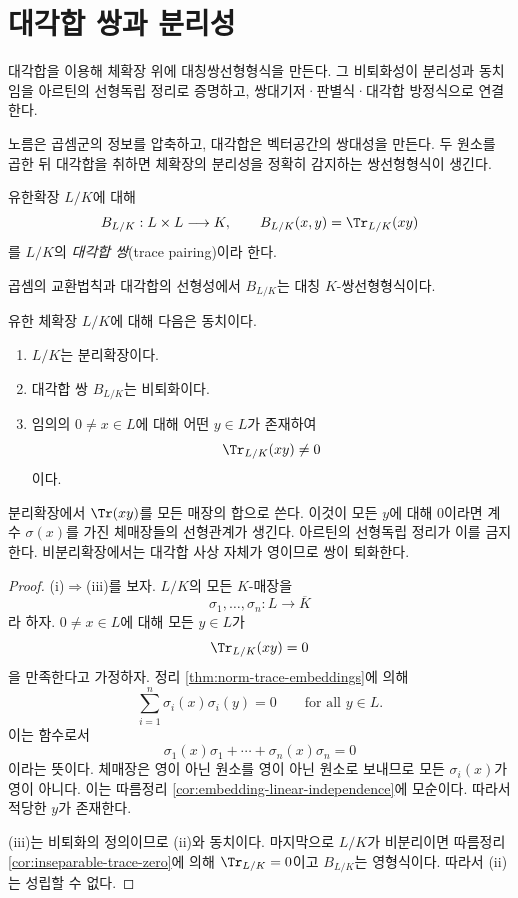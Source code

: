 \clearpage
\section{대각합 쌍과 분리성}
\label{sec:trace-pairing-separability}

\begin{learninggoal}
대각합을 이용해 체확장 위에 대칭쌍선형형식을 만든다. 그 비퇴화성이 분리성과 동치임을 아르틴의 선형독립 정리로 증명하고, 쌍대기저·판별식·대각합 방정식으로 연결한다.
\end{learninggoal}

노름은 곱셈군의 정보를 압축하고, 대각합은 벡터공간의 쌍대성을 만든다. 두 원소를 곱한 뒤 대각합을 취하면 체확장의 분리성을 정확히 감지하는 쌍선형형식이 생긴다.

\begin{definition}[대각합 쌍]
\label{def:trace-pairing}
유한확장 $L/K$에 대해
\[
  B_{L/K}:L\times L\longrightarrow K,
  \qquad
  B_{L/K}(x,y)=\Tr_{L/K}(xy)
\]
를 $L/K$의 \emph{대각합 쌍}(trace pairing)이라 한다.
\end{definition}

곱셈의 교환법칙과 대각합의 선형성에서 $B_{L/K}$는 대칭 $K$-쌍선형형식이다.

\begin{theorem}
\label{thm:trace-pairing-separable-criterion}
유한 체확장 $L/K$에 대해 다음은 동치이다.
\begin{enumerate}[label=(\roman*)]
  \item $L/K$는 분리확장이다.
  \item 대각합 쌍 $B_{L/K}$는 비퇴화이다.
  \item 임의의 $0\ne x\in L$에 대해 어떤 $y\in L$가 존재하여
  \[
    \Tr_{L/K}(xy)\ne0
  \]
  이다.
\end{enumerate}
\end{theorem}

\begin{proofidea}
분리확장에서 $\Tr(xy)$를 모든 매장의 합으로 쓴다. 이것이 모든 $y$에 대해 $0$이라면 계수 $\sigma(x)$를 가진 체매장들의 선형관계가 생긴다. 아르틴의 선형독립 정리가 이를 금지한다. 비분리확장에서는 대각합 사상 자체가 영이므로 쌍이 퇴화한다.
\end{proofidea}

\begin{proof}
(i)$\Rightarrow$(iii)를 보자. $L/K$의 모든 $K$-매장을
\[
  \sigma_1,\dots,\sigma_n:L\to\overline K
\]
라 하자. $0\ne x\in L$에 대해 모든 $y\in L$가
\[
  \Tr_{L/K}(xy)=0
\]
을 만족한다고 가정하자. 정리 \ref{thm:norm-trace-embeddings}에 의해
\[
  \sum_{i=1}^n\sigma_i(x)\sigma_i(y)=0
  \qquad\text{for all }y\in L.
\]
이는 함수로서
\[
  \sigma_1(x)\sigma_1+\cdots+\sigma_n(x)\sigma_n=0
\]
이라는 뜻이다. 체매장은 영이 아닌 원소를 영이 아닌 원소로 보내므로 모든 $\sigma_i(x)$가 영이 아니다. 이는 따름정리 \ref{cor:embedding-linear-independence}에 모순이다. 따라서 적당한 $y$가 존재한다.

(iii)는 비퇴화의 정의이므로 (ii)와 동치이다. 마지막으로 $L/K$가 비분리이면 따름정리 \ref{cor:inseparable-trace-zero}에 의해 $\Tr_{L/K}=0$이고 $B_{L/K}$는 영형식이다. 따라서 (ii)는 성립할 수 없다.
\end{proof}


